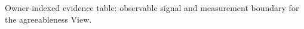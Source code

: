 \begin{table}
\centering

\caption{Owner-indexed evidence table: observable signal and measurement boundary for the agreeableness View.}
\label{tab:qy1-agreeableness-evidence}
\end{table}

